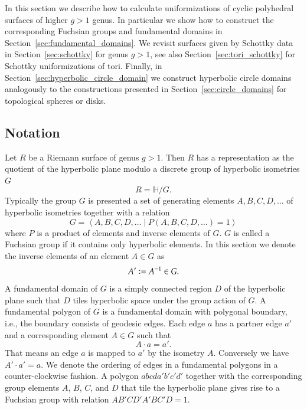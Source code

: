 \documentclass[Thesis]{subfiles}
\begin{document}

In this section we describe how to calculate uniformizations of cyclic polyhedral surfaces of higher $g>1$ genus. 
In particular we show how to construct the corresponding Fuchsian groups and fundamental domains in Section~\ref{sec:fundamental_domains}.
We revisit surfaces given by Schottky data in Section~\ref{sec:schottky} for genus $g>1$, see also Section~\ref{sec:tori_schottky} for Schottky uniformizations of tori.
Finally, in Section~\ref{sec:hyperbolic_circle_domain} we construct hyperbolic circle domains analogously to the constructions presented in Section~\ref{sec:circle_domains} for topological spheres or disks.

\subsection{Notation}

Let $R$ be a Riemann surface of genus $g>1$. 
Then $R$ has a representation as the quotient of the hyperbolic plane modulo a discrete group of hyperbolic isometries $G$
\begin{equation}
R=\mathbb{H} / G.
\end{equation}
Typically the group $G$ is presented a set of generating elements $A,B,C,D,\ldots$ of hyperbolic isometries together with a relation 
\begin{equation}
G=\left<A,B,C,D,\ldots\mid P(A,B,C,D,\ldots)=1\right>
\end{equation}
where $P$ is a product of elements and inverse elements of $G$. 
$G$ is called a Fuchsian group if it contains only hyperbolic elements.
In this section we denote the inverse elements of an element $A\in G$ as 
\begin{equation}
A'\vcentcolon=A^{-1}\in G.
\end{equation}
A fundamental domain of $G$ is a simply connected region $D$ of the hyperbolic plane such that $D$ tiles hyperbolic space under the group action of $G$.
A fundamental polygon of $G$ is a fundamental domain with polygonal boundary, i.e., the boundary consists of geodesic edges.
Each edge $a$ has a partner edge $a'$ and a corresponding element $A\in G$ such that 
\begin{equation}
A\cdot a=a'.
\end{equation}
That means an edge $a$ is mapped to $a'$ by the isometry $A$. Conversely we have $A'\cdot a'=a$.
We denote the ordering of edges in a fundamental polygons in a counter-clockwise fashion. 
A polygon $abcda'b'c'd'$ together with the corresponding group elements $A$, $B$, $C$, and $D$ that tile the hyperbolic plane gives rise to a Fuchsian group with relation $AB'CD'A'BC'D=1$.
\end{document}
